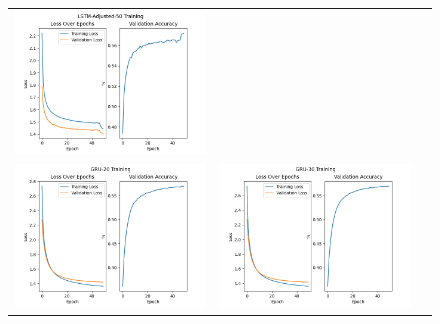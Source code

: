 \documentclass{article}
\begin{document}
\begin{enumerate}[label=1\alph*. ]
\begin{figure}[htb]
\begin{tabularx}{\textwidth}{XXX}
          \includegraphics{images/LSTM-Adjusted-50_training_new.png} \\
          \includegraphics{images/GRU-20_training_new.png} &
          \includegraphics{images/GRU-30_training_new.png} &

\end{tabularx}
\end{figure}
\end{enumerate}
\end{document}

